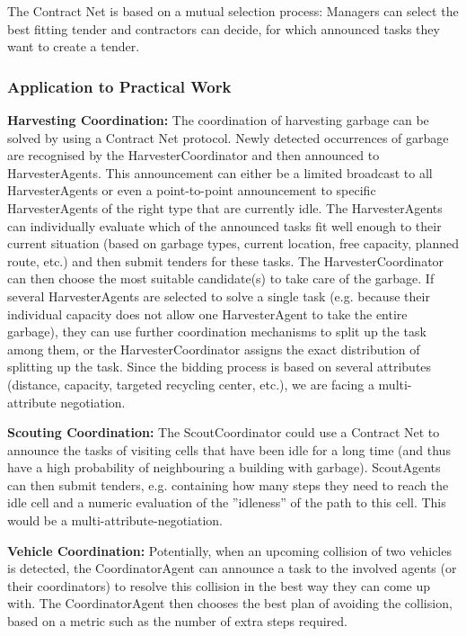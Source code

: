 The Contract Net is based on a mutual selection process: Managers can select the best fitting tender and contractors can decide, for which announced tasks they want to create a tender.  

\subsubsection{Application to Practical Work}

\textbf{Harvesting Coordination:} The coordination of harvesting garbage can be solved by using a Contract Net protocol. Newly detected occurrences of garbage are recognised by the HarvesterCoordinator and then announced to HarvesterAgents. This announcement can either be a limited broadcast to all HarvesterAgents or even a point-to-point announcement to specific HarvesterAgents of the right type that are currently idle. The HarvesterAgents can individually evaluate which of the announced tasks fit well enough to their current situation (based on garbage types, current location, free capacity, planned route, etc.) and then submit tenders for these tasks. The HarvesterCoordinator can then choose the most suitable candidate(s) to take care of the garbage. If several HarvesterAgents are selected to solve a single task (e.g. because their individual capacity does not allow one HarvesterAgent to take the entire garbage), they can use further coordination mechanisms to split up the task among them, or the HarvesterCoordinator assigns the exact distribution of splitting up the task. Since the bidding process is based on several attributes (distance, capacity, targeted recycling center, etc.), we are facing a multi-attribute negotiation.

\textbf{Scouting Coordination:} The ScoutCoordinator could use a Contract Net to announce the tasks of visiting cells that have been idle for a long time (and thus have a high probability of neighbouring a building with garbage). ScoutAgents can then submit tenders, e.g. containing how many steps they need to reach the idle cell and a numeric evaluation of the ''idleness'' of the path to this cell. This would be a multi-attribute-negotiation.

\textbf{Vehicle Coordination:} Potentially, when an upcoming collision of two vehicles is detected, the CoordinatorAgent can announce a task to the involved agents (or their coordinators) to resolve this collision in the best way they can come up with. The CoordinatorAgent then chooses the best plan of avoiding the collision, based on a metric such as the number of extra steps required.

